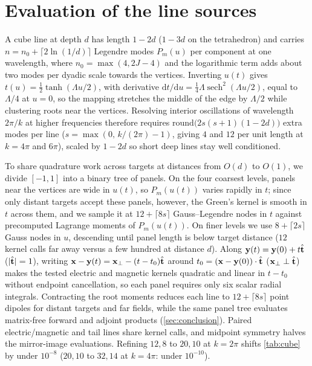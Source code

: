 \section{Evaluation of the line sources}
\setcounter{table}{0}
\label{app:lines}

A cube line at depth $d$ has length $1-2d$ ($1-3d$ on the tetrahedron) and carries $n = n_0 + \lceil 2\ln(1/d)\rceil$ Legendre modes $P_m(u)$ per component at one wavelength, where $n_0 = \max(4, 2J-4)$ and the logarithmic term adds about two modes per dyadic scale towards the vertices. Inverting $u(t)$ gives $t(u) = \tfrac12\tanh(\Lambda u/2)$, with derivative $\mathrm{d}t/\mathrm{d}u = \tfrac14\Lambda\operatorname{sech}^2(\Lambda u/2)$, equal to $\Lambda/4$ at $u = 0$, so the mapping stretches the middle of the edge by $\Lambda/2$ while clustering roots near the vertices. Resolving interior oscillations of wavelength $2\pi/k$ at higher frequencies therefore requires $\mathrm{round}\bigl(2s(s+1)(1-2d)\bigr)$ extra modes per line ($s = \max(0,\,k/(2\pi)-1)$, giving $4$ and $12$ per unit length at $k = 4\pi$ and $6\pi$), scaled by $1-2d$ so short deep lines stay well conditioned.

To share quadrature work across targets at distances from $O(d)$ to $O(1)$, we divide $[-1,1]$ into a binary tree of panels. On the four coarsest levels, panels near the vertices are wide in $u(t)$, so $P_m(u(t))$ varies rapidly in $t$; since only distant targets accept these panels, however, the Green's kernel is smooth in $t$ across them, and we sample it at $12 + \lceil 8s\rceil$ Gauss--Legendre nodes in $t$ against precomputed Lagrange moments of $P_m(u(t))$. On finer levels we use $8 + \lceil 2s\rceil$ Gauss nodes in $u$, descending until panel length is below target distance ($12$ kernel calls far away versus a few hundred at distance $d$). Along $\mathbf{y}(t) = \mathbf{y}(0) + t\hat{\mathbf{t}}$ ($|\hat{\mathbf{t}}| = 1$), writing $\mathbf{x} - \mathbf{y}(t) = \mathbf{x}_\perp - (t - t_0)\hat{\mathbf{t}}$ around $t_0 = (\mathbf{x} - \mathbf{y}(0))\cdot\hat{\mathbf{t}}$ ($\mathbf{x}_\perp\perp\hat{\mathbf{t}}$) makes the tested electric and magnetic kernels quadratic and linear in $t - t_0$ without endpoint cancellation, so each panel requires only six scalar radial integrals. Contracting the root moments reduces each line to $12 + \lceil 8s\rceil$ point dipoles for distant targets and far fields, while the same panel tree evaluates matrix-free forward and adjoint products (\autoref{sec:conclusion}). Paired electric/magnetic and tail lines share kernel calls, and midpoint symmetry halves the mirror-image evaluations. Refining $12,8$ to $20,10$ at $k = 2\pi$ shifts \autoref{tab:cube} by under $10^{-8}$ ($20,10$ to $32,14$ at $k = 4\pi$: under $10^{-10}$).

